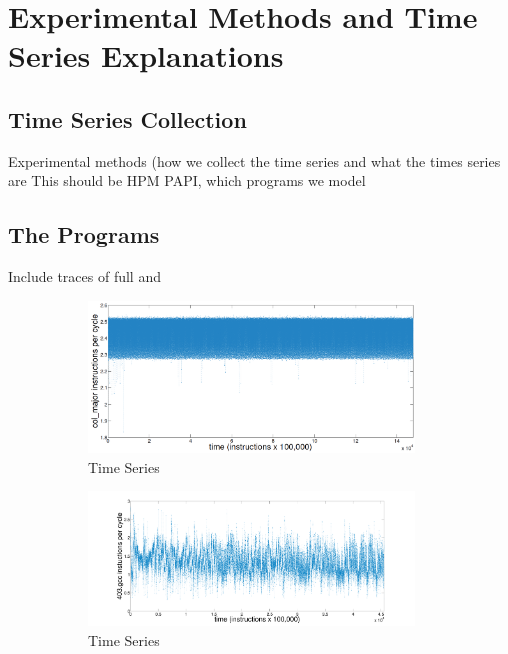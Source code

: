 \section{Experimental Methods and Time Series Explanations}

\subsection{Time Series Collection}
 Experimental methods (how we collect the time series and what the times series are
This should be HPM PAPI, which programs we model


\subsection{The Programs}
Include traces of full \col \svd and \gcc
\begin{figure}[htbp]
  \centering
  \begin{subfigure}[t]{0.475\textwidth}
    \includegraphics[width=0.95\textwidth]{figs/colFullTS}
    \caption{\col Time Series}
    \label{fig:col-ts}
  \end{subfigure}%
  \begin{subfigure}[t]{0.475\textwidth}
    \includegraphics[width=0.95\textwidth]{figs/gccfullts}
    \caption{\gcc Time Series}
    \label{fig:gcc-ts}
  \end{subfigure}
    \begin{subfigure}[t]{0.475\textwidth}

\end{subfigure}
\end{figure}
